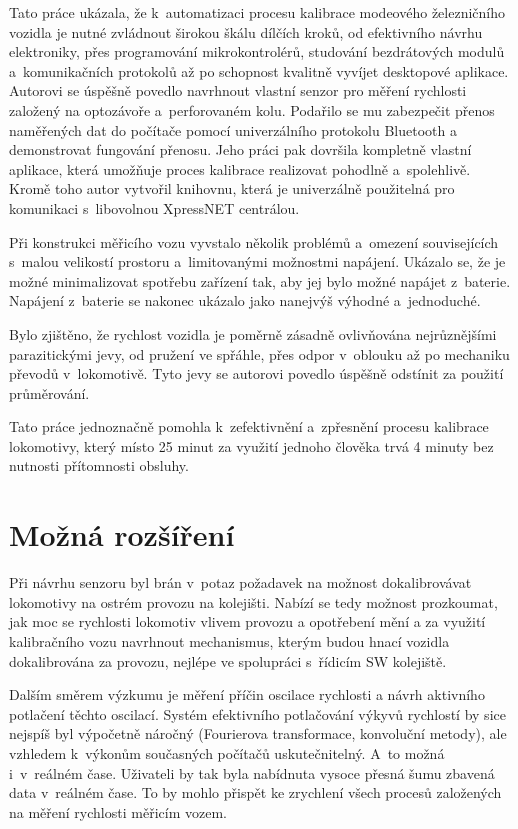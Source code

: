Tato práce ukázala, že k~automatizaci procesu kalibrace modeového železničního
vozidla je nutné zvládnout širokou škálu dílčích kroků, od efektivního návrhu
elektroniky, přes programování mikrokontrolérů, studování bezdrátových modulů
a~komunikačních protokolů až po schopnost kvalitně vyvíjet desktopové aplikace.
Autorovi se úspěšně povedlo navrhnout vlastní senzor pro měření rychlosti
založený na optozávoře a~perforovaném kolu. Podařilo se mu zabezpečit přenos
naměřených dat do počítače pomocí univerzálního protokolu Bluetooth a
demonstrovat fungování přenosu. Jeho práci pak dovršila kompletně vlastní
aplikace, která umožňuje proces kalibrace realizovat pohodlně a~spolehlivě.
Kromě toho autor vytvořil knihovnu, která je univerzálně použitelná pro
komunikaci s~libovolnou XpressNET centrálou.

Při konstrukci měřicího vozu vyvstalo několik problémů a~omezení souvisejících
s~malou velikostí prostoru a~limitovanými možnostmi napájení. Ukázalo se, že je
možné minimalizovat spotřebu zařízení tak, aby jej bylo možné napájet
z~baterie.  Napájení z~baterie se nakonec ukázalo jako nanejvýš výhodné
a~jednoduché.

Bylo zjištěno, že rychlost vozidla je poměrně zásadně ovlivňována nejrůznějšími
parazitickými jevy, od pružení ve spřáhle, přes odpor v~oblouku až po mechaniku
převodů v~lokomotivě. Tyto jevy se autorovi povedlo úspěšně odstínit za použití
průměrování.

Tato práce jednoznačně pomohla k~zefektivnění a~zpřesnění procesu kalibrace
lokomotivy, který místo 25 minut za využití jednoho člověka trvá 4 minuty
bez nutnosti přítomnosti obsluhy.

\section{Možná rozšíření}

Při návrhu senzoru byl brán v~potaz požadavek na možnost dokalibrovávat
lokomotivy na ostrém provozu na kolejišti. Nabízí se tedy možnost prozkoumat,
jak moc se rychlosti lokomotiv vlivem provozu a opotřebení mění a za využití
kalibračního vozu navrhnout mechanismus, kterým budou hnací vozidla
dokalibrována za provozu, nejlépe ve spolupráci s~řídicím SW kolejiště.

Dalším směrem výzkumu je měření příčin oscilace rychlosti a návrh
aktivního potlačení těchto oscilací. Systém efektivního potlačování výkyvů
rychlostí by sice nejspíš byl výpočetně náročný (Fourierova transformace,
konvoluční metody), ale vzhledem k~výkonům současných počítačů uskutečnitelný.
A~to možná i~v~reálném čase. Uživateli by tak byla nabídnuta vysoce přesná šumu
zbavená data v~reálném čase. To by mohlo přispět ke zrychlení všech procesů
založených na měření rychlosti měřicím vozem.

